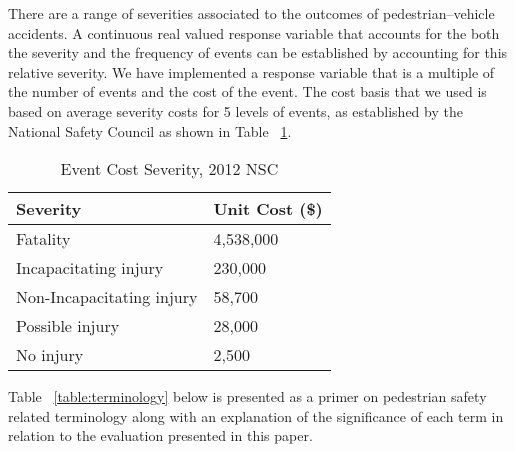 \documentclass{llncs}
\begin{document}
There are a range of severities associated to the outcomes of pedestrian--vehicle accidents. A continuous real valued response variable that accounts for the both the severity and the frequency of events can be established by accounting for this relative severity. We have implemented a response variable that is a multiple of the number of events and the cost of the event. The cost basis that we used is based on average severity costs for 5 levels of events, as established by the National Safety Council \cite{nsc2012estimating} as shown in Table ~\ref{table:eventseverity}.
%
\FloatBarrier
\begin{table}[!h]
\begin{center}
\caption{Event Cost Severity, 2012 NSC}
\label{table:eventseverity}
\begin{tabular}{p{50mm}  p{50mm}}
\hline
\rule{0pt}{12pt}
Severity & Unit Cost (\$)\\[2pt]
\hline
Fatality 					&	4,538,000\\
Incapacitating injury 		&	230,000\\
Non-Incapacitating injury 	&	58,700\\
Possible injury 			&	28,000\\
No injury 					&	2,500\\[2pt]
\hline
\end{tabular}
\end{center}
\end{table}
\FloatBarrier
%
Table ~\ref{table:terminology} below is presented as a primer on pedestrian safety related terminology along with an explanation of the significance of each term in relation to the evaluation presented in this paper.
%
\FloatBarrier
\end{document}
